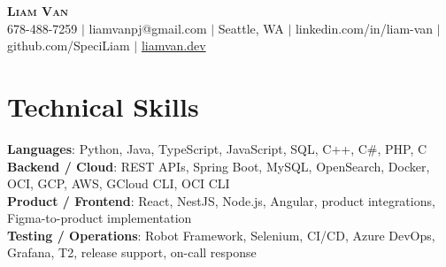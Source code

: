\documentclass[letterpaper,11pt]{article}
\begin{document}

%
\begin{center}
    \textbf{\Huge \scshape Liam Van} \\ \vspace{1pt}
    \small 678-488-7259 $|$ liamvanpj@gmail.com $|$ Seattle, WA $|$
    linkedin.com/in/liam-van $|$ github.com/SpeciLiam $|$ \href{https://liamvan.dev}{liamvan.dev}

\end{center}

\section{Technical Skills}
 \begin{itemize}[leftmargin=0.15in, label={}]
    \small{\item{
     \textbf{Languages}{: Python, Java, TypeScript, JavaScript, SQL, C++, C\#, PHP, C} \\
     \textbf{Backend / Cloud}{: REST APIs, Spring Boot, MySQL, OpenSearch, Docker, OCI, GCP, AWS, GCloud CLI, OCI CLI} \\
     \textbf{Product / Frontend}{: React, NestJS, Node.js, Angular, product integrations, Figma-to-product implementation} \\
     \textbf{Testing / Operations}{: Robot Framework, Selenium, CI/CD, Azure DevOps, Grafana, T2, release support, on-call response} \\
    }}
 \end{itemize}
%

\end{document}
